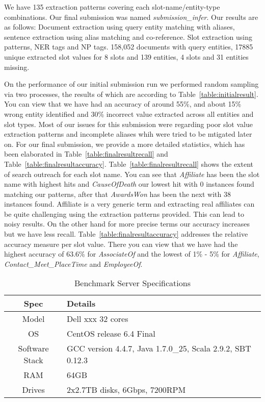  
 
 
We have 135 extraction patterns covering each slot-name/entity-type combinations. Our final submission was named \textit{submission\_infer}. Our results are as follows: Document extraction using query entity matching with aliases, sentence extraction using alias matching and co-reference. Slot extraction using patterns, NER tags and NP tags. 158,052 documents with query entities, 17885 unique extracted slot values for 8 slots and 139 entities, 4 slots and 31 entities missing.

On the performance of our initial submission run we performed random sampling via two processes, the results of which are according to Table~\ref{table:initialresult}. You can view that we have had an accuracy of around 55\%, and about 15\% wrong entity identified and 30\% incorrect value extracted across all entities and slot types. Most of our issues for this submission were regarding poor slot value extraction patterns and incomplete aliases whih were tried to be mtigated later on. For our final submission, we provide a more detailed statistics, which has been elaborated in Table~\ref{table:finalresultrecall} and Table~\ref{table:finalresultaccuracy}. Table~\ref{table:finalresultrecall} shows the extent of search outreach for
each slot name. You can see that \textit{Affiliate} has been the slot name with highest hits and \textit{CauseOfDeath} our lowest hit with 0 instances found matching our patterns, after that \textit{AwardsWon} has been the next with 38 instances found. Affiliate is a very generic term and extracting real affiliates can be quite challenging using the extraction patterns provided. This can lead to noisy results. On the other hand for more precise terms our accuracy increases but we have less recall. Table~\ref{table:finalresultaccuracy} addresses the relative accuracy measure per slot value. There you can view that we have had the highest accuracy of 63.6\% for \textit{AssociateOf} and the lowest of 1\% - 5\%  for \textit{Affiliate}, \textit{Contact\_Meet\_PlaceTime} and \textit{EmployeeOf}.

\begin{table}
\caption{Benchmark Server Specifications }
\centering
\label{table:serverspec}
\begin{tabular}{| c | p{4.8cm} |}
\hline 
\textbf{Spec} & \textbf{Details} \\ \hline
Model & Dell xxx 32 cores \\ \hline 
OS & CentOS release 6.4 Final \\ \hline 
Software Stack & GCC version 4.4.7, Java 1.7.0\_25, Scala 2.9.2, SBT 0.12.3 \\ \hline 
 RAM & 64GB\\ \hline 
 Drives & 2x2.7TB disks, 6Gbps, 7200RPM\\ \hline 
\end{tabular} 
\end{table}







